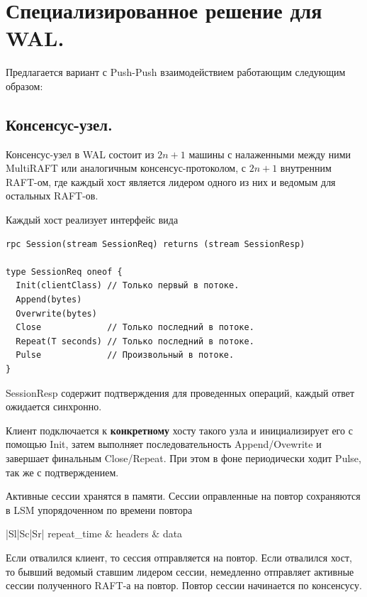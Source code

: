 \documentclass[a4paper,12pt]{article}
\begin{document}
\section{Специализированное решение для WAL.}

Предлагается вариант с Push-Push взаимодействием работающим следующим образом:

\subsection{Консенсус-узел.}

Консенсус-узел в WAL состоит из $2n + 1$ машины с налаженными между ними MultiRAFT или аналогичным консенсус-протоколом, с $2n + 1$ внутренним
RAFT-ом, где каждый хост является лидером одного из них и ведомым для остальных RAFT-ов.

Каждый хост реализует интерфейс вида

\begin{lstlisting}
rpc Session(stream SessionReq) returns (stream SessionResp)

type SessionReq oneof {
  Init(clientClass) // Только первый в потоке.
  Append(bytes)
  Overwrite(bytes)
  Close             // Только последний в потоке.
  Repeat(T seconds) // Только последний в потоке.
  Pulse             // Произвольный в потоке.
}
\end{lstlisting}

SessionResp содержит подтверждения для проведенных операций, каждый ответ ожидается синхронно.

Клиент подключается к \textbf{конкретному} хосту такого узла и инициализирует его с помощью Init, затем выполняет последовательность Append/Ovewrite
и завершает финальным Close/Repeat. При этом в фоне периодически ходит Pulse, так же с подтверждением.

Активные сессии хранятся в памяти. Сессии оправленные на повтор сохраняются в LSM упорядоченном по времени повтора

\begin{center}
\begin{tabular}{|Sl|Sc|Sr|}
    \hline
    repeat\_time & headers & data \\
    \hline
\end{tabular}
\end{center}

Если отвалился клиент, то сессия отправляется на повтор. Если отвалился хост, то бывший ведомый ставшим лидером сессии, немедленно
отправляет активные сессии полученного RAFT-а на повтор. Повтор сессии начинается по консенсусу.
\end{document}
